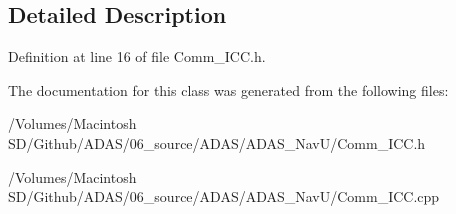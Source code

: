 \subsection{Detailed Description}


Definition at line 16 of file Comm\+\_\+\+I\+C\+C.\+h.



The documentation for this class was generated from the following files\+:\begin{DoxyCompactItemize}
\item 
/\+Volumes/\+Macintosh S\+D/\+Github/\+A\+D\+A\+S/06\+\_\+source/\+A\+D\+A\+S/\+A\+D\+A\+S\+\_\+\+Nav\+U/Comm\+\_\+\+I\+C\+C.\+h\item 
/\+Volumes/\+Macintosh S\+D/\+Github/\+A\+D\+A\+S/06\+\_\+source/\+A\+D\+A\+S/\+A\+D\+A\+S\+\_\+\+Nav\+U/Comm\+\_\+\+I\+C\+C.\+cpp\end{DoxyCompactItemize}
